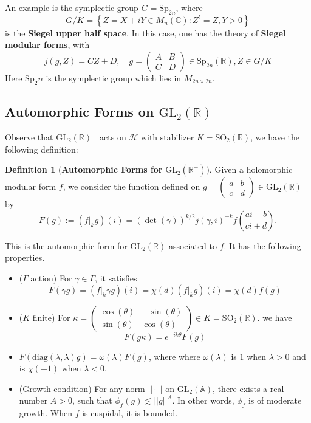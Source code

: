 \documentclass[11pt,english]{smfart}
\theoremstyle{definition}
\newtheorem{definition}{Definition}
\theoremstyle{remark}
\begin{document}
An example is the symplectic group $ G=\mathrm{Sp}_{2 n} $, where
\[G / K=\left\{Z=X+i Y \in M_{n}(\mathbb{C}): Z^{t}=Z, Y>0\right\} \]
is the \textbf{Siegel upper half space}.
In this case, one has the theory of \textbf{Siegel modular forms}, with
\[j(g, Z)=C Z+D, \quad g =\left(\begin{array}{cc}
    A & B \\
    C & D
\end{array}\right) \in \mathrm{Sp}_{2 n}(\mathbb{R}), Z \in G / K\]
Here $\mathrm{Sp}_2n$ is the symplectic group which lies in $M_{2n \times 2n}.$
\subsection{Automorphic Forms on $\mathrm{GL_2}(\mathbb{R})^{+}$}
Observe that $\mathrm{GL_2}(\mathbb{R})^{+}$ acts on $\mathcal{H}$ with stabilizer $K=\mathrm{SO_2}(\mathbb{R})$, we have the following definition:
\begin{definition}[\textbf{Automorphic Forms for} $\mathrm{GL_2}(\mathbb{R}^{+})$]
Given a holomorphic modular form $ f $, we consider the function defined on $ g=\left(\begin{array}{ll}a & b \\ c & d\end{array}\right) \in \mathrm{GL}_{2}(\mathbb{R})^{+}$ by
\[F(g):=\left(\left.f\right|_{k} g\right)(i)=(\operatorname{det}(\gamma))^{k / 2}j(\gamma, i)^{-k} f\left(\frac{a i+b}{c i+d}\right) .\]
\end{definition}
This is the automorphic form for $ \mathrm{GL}_{2}(\mathbb{R}) $ associated to $ f $. It has the following properties.
\begin{itemize}
    \item ($\Gamma$ action) For $\gamma \in \Gamma$, it satisfies
    \[ F(\gamma g)=(f |_k \gamma g) (i)= \chi(d) (f |_kg)(i)=\chi (d) f(g)\]
    \item ($K$ finite) For $\kappa =\left(\begin{array}{ll}\cos(\theta) & -\sin(\theta) \\ \sin(\theta) & \cos(\theta)\end{array}\right)\in K =\mathrm{SO}_2(\mathbb{R}) $. we have
    \[F(g \kappa )=e^{-ik\theta} F(g)\]
    \item $F(\mathrm{diag} (\lambda,\lambda) g)=\omega (\lambda) F(g)$, where where $\omega (\lambda)$ is $1$ when $\lambda > 0$ and is $\chi(-1)$ when $\lambda < 0$.
    \item (Growth condition) For any norm $||\cdot||$ on $\mathrm{GL_2}(\mathbb{A})$, there exists a real number $A >0$, such that $\phi_f(g) \lesssim ||g||^{A}$. In other words, $\phi_f$ is of moderate growth.
    When $f$ is cuspidal, it is bounded.
\end{itemize}
\end{document}
